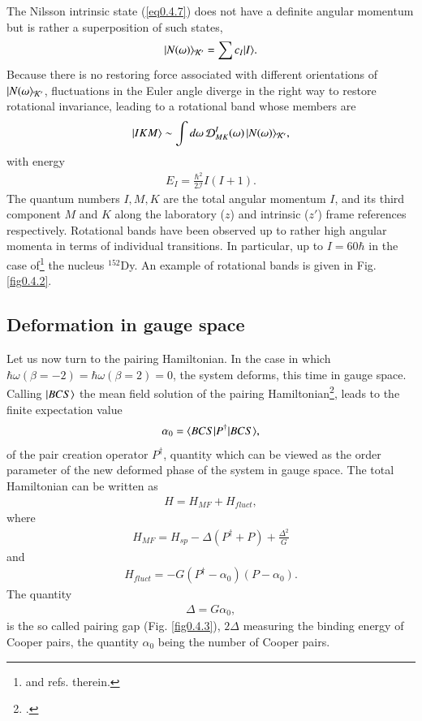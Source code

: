 The Nilsson intrinsic state (\ref{eq0.4.7}) does not have a definite angular momentum but is rather a superposition of such states,
\begin{align}\label{eq0.4.11}
|{N(\omega)} \rangle_{\mathcal K'}=\sum c_I|{I} \rangle.
\end{align}
Because there is no restoring force associated with different orientations of $|{N(\omega} \rangle_{\mathcal K'}$, fluctuations in the Euler angle diverge in the right way to restore rotational invariance, leading to a rotational band whose members are 
\begin{align}\label{eq0.1.47}
|{IKM} \rangle\sim\int d\omega \,\mathcal D^I_{MK}(\omega)\,|{N(\omega)} \rangle_{\mathcal K'},
\end{align}
with energy
\begin{align}\label{eq0.1.48}
E_I=\frac{\hbar^2}{2\mathcal I}I(I+1).
\end{align}
The quantum numbers $I,M,K$ are the total angular momentum $I$, and its third component $M$ and $K$ along the laboratory ($z$) and intrinsic ($z'$) frame references respectively.
Rotational bands have been observed up to rather high angular momenta in terms of individual transitions. In particular, up to $I=60\hbar$ in the case of\footnote{\cite{Nolan:88} and refs. therein.} the nucleus $^{152}$Dy. An example of rotational bands  is given in Fig. \ref{fig0.4.2}. 
\subsection{Deformation in gauge space}
Let us now turn to the pairing Hamiltonian. In the case in which \mbox{$\hbar\omega(\beta=-2)=\hbar\omega(\beta=2)=0$}, the system deforms, this time in gauge space. Calling $|{BCS} \rangle$ the  mean field solution of the pairing Hamiltonian\footnote{\cite{Bardeen:57a,Bardeen:57b}.}, leads to the finite expectation value
\begin{align}\label{eq0.4.14}
\alpha_0=\langle {BCS|P^\dagger|BCS} \rangle,
 \end{align}
   of the pair creation operator $P^\dagger$, quantity which can be viewed as the order parameter of the new deformed  phase of the system in gauge space. The total Hamiltonian can be written as
\begin{align}\label{eq0.1.50}
H=H_{MF}+H_{fluct},
\end{align}
where 
\begin{align}\label{eq0.1.51}
H_{MF}=H_{sp}-\Delta(P^\dagger+P)+\frac{\Delta^2}{G}
\end{align}
and
\begin{align}\label{eq0.1.52}
H_{fluct}=-G(P^\dagger-\alpha_0)(P-\alpha_0).
\end{align}
The quantity 
\begin{align}\label{eq0.1.53}
\Delta=G\alpha_0,
\end{align}
is the so called pairing gap (Fig. \ref{fig0.4.3}), $2\Delta$ measuring the binding energy of Cooper pairs, the quantity $\alpha_0$ being the number of Cooper pairs.

